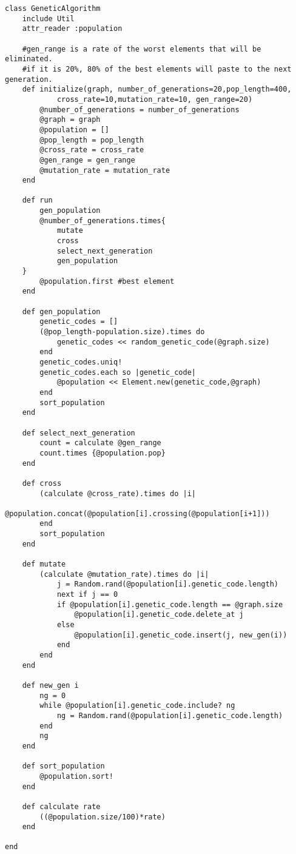 
\begin{verbatim}
class GeneticAlgorithm
	include Util
	attr_reader :population
	
	#gen_range is a rate of the worst elements that will be eliminated.
	#if it is 20%, 80% of the best elements will paste to the next generation.
	def initialize(graph, number_of_generations=20,pop_length=400, 
			cross_rate=10,mutation_rate=10, gen_range=20)
		@number_of_generations = number_of_generations
		@graph = graph
		@population = []
		@pop_length = pop_length
		@cross_rate = cross_rate
		@gen_range = gen_range
		@mutation_rate = mutation_rate
	end

	def run
		gen_population
		@number_of_generations.times{
			mutate
			cross
			select_next_generation
			gen_population
	}
		@population.first #best element
	end

	def gen_population
		genetic_codes = []
		(@pop_length-population.size).times do 
			genetic_codes << random_genetic_code(@graph.size)
		end
		genetic_codes.uniq!
		genetic_codes.each so |genetic_code| 
			@population << Element.new(genetic_code,@graph) 
		end
		sort_population
	end

	def select_next_generation
		count = calculate @gen_range
		count.times {@population.pop}
	end

	def cross
		(calculate @cross_rate).times do |i| 
			@population.concat(@population[i].crossing(@population[i+1]))
		end
		sort_population
	end

	def mutate
		(calculate @mutation_rate).times do |i|
			j = Random.rand(@population[i].genetic_code.length)
			next if j == 0
			if @population[i].genetic_code.length == @graph.size
				@population[i].genetic_code.delete_at j
			else
				@population[i].genetic_code.insert(j, new_gen(i))
			end
		end
	end

	def new_gen i
		ng = 0
		while @population[i].genetic_code.include? ng
			ng = Random.rand(@population[i].genetic_code.length)
		end
		ng
	end

	def sort_population
		@population.sort!
	end

	def calculate rate
		((@population.size/100)*rate)
	end

end
\end{verbatim}